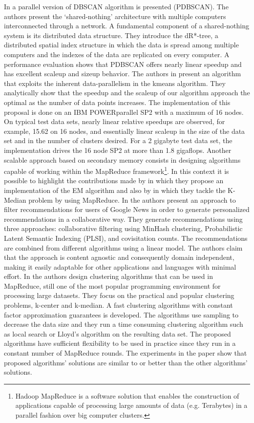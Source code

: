 \documentclass[a4paper]{article}
\begin{document}
In \cite{XJK99}  a parallel version of DBSCAN algorithm is presented (PDBSCAN). The authors present the ‘shared-nothing’ architecture with multiple computers interconnected through a network. A fundamental component of a shared-nothing system is its distributed data structure. They introduce the dR*-tree, a distributed spatial index structure in which the data is spread among multiple computers and the indexes of the data are replicated on every computer. A performance evaluation shows that PDBSCAN offers nearly linear speedup and has excellent scaleup and sizeup behavior. The authors in \cite{DM99} present an algorithm that exploits the inherent data-parallelism in the kmeans algorithm. They analytically show that the speedup and the scaleup of our algorithm approach the optimal as the number of data points increases. The implementation of this proposal is done on an IBM POWERparallel SP2 with a maximum of 16 nodes. On typical test data sets, nearly linear relative speedups are observed, for example, 15.62 on 16 nodes, and essentially linear scaleup in the size of the data set and in the number of clusters desired. For a 2 gigabyte test data set, the implementation drives the 16 node SP2 at more than 1.8 gigaflops.
Another scalable approach based on secondary memory consists in designing algorithms capable of working within the MapReduce framework\footnote{Hadoop MapReduce is a software solution that enables the construction of applications capable of processing large amounts of data (e.g. Terabytes) in a parallel fashion over big computer clusters.}. In this context it is possible to highlight the contributions made by \cite{DDGR07} in which they propose an implementation of the EM algorithm and also by \cite{EIM11} in which they tackle the K-Median problem by using MapReduce.
In \cite{DDGR07} the authors present an approach to filter recommendations for users of Google News in order to generate personalized recommendations in a collaborative way. They generate recommendations using three approaches: collaborative filtering using MinHash clustering, Probabilistic Latent Semantic Indexing (PLSI), and covisitation counts. The recommendations are combined from different algorithms using a linear model. The authors claim that the approach is content agnostic and consequently domain independent, making it easily adaptable for other applications and languages with minimal effort. In \cite{EIM11} the authors design clustering algorithms that can be used in MapReduce, still one of the most popular programming environment for processing large datasets. They focus on the practical and popular clustering problems, k-center and k-median. A fast clustering algorithms with constant factor approximation guarantees is developed. The algorithms use sampling to decrease the data size and they run a time consuming clustering algorithm such as local search or Lloyd's algorithm on the resulting data set. The proposed algorithms have sufficient flexibility to be used in practice since they run in a constant number of MapReduce rounds.  The experiments in the paper show that proposed algorithms' solutions are similar to or better than the other algorithms' solutions.
\end{document}
